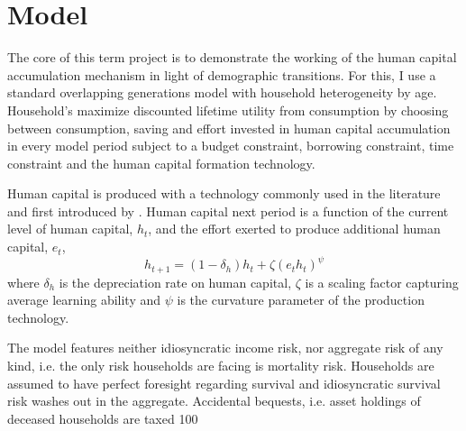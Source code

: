\section{Model}
\label{sec:model}

The core of this term project is to demonstrate the working of the human capital accumulation mechanism in light of demographic transitions. For this, I use a standard overlapping generations model with household heterogeneity by age. Household's maximize discounted lifetime utility from consumption by choosing between consumption, saving and effort invested in human capital accumulation in every model period subject to a budget constraint, borrowing constraint, time constraint and the human capital formation technology.

Human capital is produced with a technology commonly used in the literature and first introduced by \cite{Ben-Porath1967}. Human capital next period is a function of the current level of human capital, $h_t$, and the effort exerted to produce additional human capital, $e_t$,
$$ h_{t+1} = (1-\delta_h) h_t + \zeta (e_t h_t)^\psi$$
where $\delta_h$ is the depreciation rate on human capital, $\zeta$ is a scaling factor capturing average learning ability and $\psi$ is the curvature parameter of the production technology.

The model features neither idiosyncratic income risk, nor aggregate risk of any kind, i.e. the only risk households are facing is mortality risk. Households are assumed to have perfect foresight regarding survival and idiosyncratic survival risk washes out in the aggregate. Accidental bequests, i.e. asset holdings of deceased households are taxed 100%


